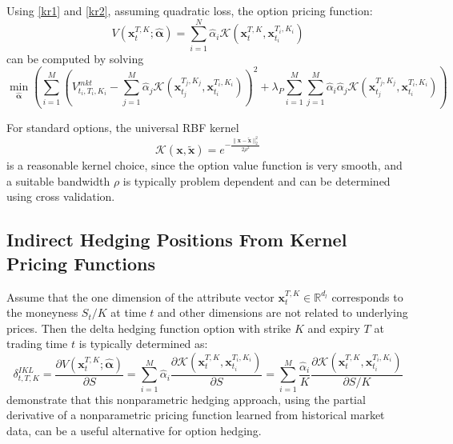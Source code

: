 \documentclass[letterpaper,12pt,titlepage,oneside,final]{book}
\numberwithin{equation}{section}
\theoremstyle{definition}
\newcommand{\vx}{\mathbf{x}}
\newcommand{\Real}{\mathbb{R}}
\newcommand{\valpha}{\pmb{\widehat{\alpha}}}
\newcommand{\Vmkt}{V^{mkt}}
\begin{document}
Using \eqref{kr1} and \eqref{kr2}, assuming quadratic loss, the option pricing function:
\[
	V(\vx_{t}^{T,K};\mathbf{\widehat{\alpha}})=\sum_{i=1}^N \widehat{\alpha}_i \mathcal{K}(\vx_{t}^{T,K},\vx_{t_i}^{T_i,K_i})
\] can be computed by solving
\begin{equation}
\min_{\mathbf{\widehat{\alpha}}} \left(  \sum_{i=1}^M \left( \Vmkt_{t_i,T_i,K_i}-\sum_{j=1}^M \widehat{\alpha}_j \mathcal{K}(\vx_{t_j}^{T_j,K_j},\vx_{t_i}^{T_i,K_i}) \right)^2+\lambda_P \sum_{i=1}^M\sum_{j=1}^M  \widehat{\alpha}_i \widehat{\alpha}_j \mathcal{K}(\vx_{t_j}^{T_j,K_j},\vx_{t_i}^{T_i,K_i})\right)
\label{eq:indirectf}
\end{equation}


For standard options, the universal RBF kernel
\begin{equation} \label{eq:RBF}
\mathcal{K}(\vx,\tilde{\vx})=e^{-\frac{\|\vx-\tilde{\vx}\|_2^2}{2 \rho^2}}
\end{equation}
is a reasonable kernel choice, since the option value function is very smooth, and
a suitable bandwidth $\rho$ is typically problem dependent and can be determined using cross validation.


\subsection{Indirect Hedging Positions From Kernel Pricing Functions} \label{sec:VF}

Assume that the one dimension  of the attribute vector $\vx_{t}^{T,K} \in \Real^{d_l}$ corresponds to the moneyness $S_t/K$ at time $t$ and other dimensions are not related to underlying prices. Then the delta hedging function option with strike $K$ and expiry $T$ at trading time $t$ is typically determined as:
\begin{equation}\label{eq:dV}
	\delta^{IKL}_{t,T,K}=
\frac{\partial V(\mathbf{x}_{t}^{T,K};\valpha)}{\partial S}=\sum_{i=1}^M  \widehat{\alpha}_i\frac{\partial \mathcal{K}(\mathbf{x}_{t}^{T,K},\vx_{t_i}^{T_i,K_i})}{\partial S} = \sum_{i=1}^M  \frac{\widehat{\alpha}_i}{K} \frac{\partial \mathcal{K}(\mathbf{x}_{t}^{T,K},\vx_{t_i}^{T_i,K_i})}{\partial S/K} 
\end{equation}
\citet{hutchinson} demonstrate that this nonparametric hedging approach,  using the partial derivative of a nonparametric pricing function learned from historical market data, can be a useful alternative for option hedging.
\end{document}
